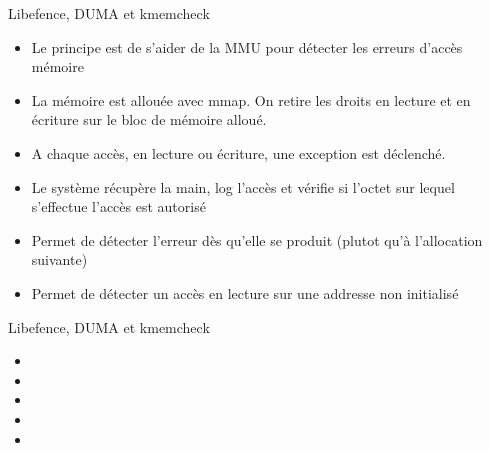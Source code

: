 \begin{frame}[fragile=singleslide]{Libefence, DUMA et kmemcheck}
  \begin{itemize}
  \item Le principe est de s'aider de la MMU pour détecter les erreurs
    d'accès mémoire
  \item  La mémoire est  allouée avec  mmap. On  retire les  droits en
    lecture et en écriture sur le bloc de mémoire alloué.
  \item  A chaque  accès, en  lecture ou  écriture, une  exception est
    déclenché.
  \item Le système récupère la main, log l'accès et vérifie si l'octet
    sur lequel s'effectue l'accès est autorisé
  \item  Permet de détecter  l'erreur dès  qu'elle se  produit (plutot
    qu'à l'allocation suivante)
  \item Permet  de détecter un accès  en lecture sur  une addresse non
    initialisé
  \end{itemize}
\end{frame}

\begin{frame}[fragile=singleslide]{Libefence, DUMA et kmemcheck}
  \begin{itemize}
  \item {}
  \item {}
  \item {}
  \item
  \item {}
  \end{itemize}
\end{frame}

